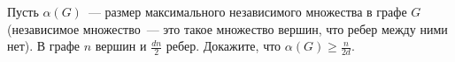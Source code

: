 Пусть $\alpha(G)$~--- размер максимального независимого множества в графе $G$ (независимое множество~--- это такое множество
вершин, что ребер между ними нет). В графе $n$ вершин и $\frac{d n}{2}$ ребер. Докажите, что $\alpha(G) \ge \frac{n}{2d}$. 